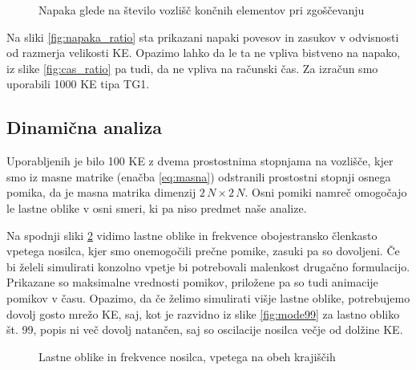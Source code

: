 \begin{figure}[ht]
    \centering
    \caption{Napaka glede na število vozlišč končnih elementov pri zgoščevanju}
    \label{fig:napaka_zgost}
\end{figure}

Na sliki \ref{fig:napaka_ratio} sta prikazani napaki povesov in zasukov v odvisnosti od razmerja velikosti KE. Opazimo lahko da le ta ne vpliva bistveno na napako, iz slike \ref{fig:cas_ratio} pa tudi, da ne vpliva na računski čas. Za izračun smo uporabili 1000 KE tipa TG1.


\FloatBarrier
\subsection{Dinamična analiza}

Uporabljenih je bilo 100 KE z dvema prostostnima stopnjama na vozlišče, kjer smo iz masne matrike (enačba \ref{eq:masna}) odstranili prostostni stopnji osnega pomika, da je masna matrika dimenzij $2\,N\times 2\,N$. Osni pomiki namreč omogočajo le lastne oblike v osni smeri, ki pa niso predmet naše analize.

Na spodnji sliki \ref{fig:last_vpet} vidimo lastne oblike in frekvence obojestransko členkasto vpetega nosilca, kjer smo onemogočili prečne pomike, zasuki pa so dovoljeni. Če bi želeli simulirati konzolno vpetje bi potrebovali malenkost drugačno formulacijo. Prikazane so maksimalne vrednosti pomikov, priložene pa so tudi animacije pomikov v času. Opazimo, da če želimo simulirati višje lastne oblike, potrebujemo dovolj gosto mrežo KE, saj, kot je razvidno iz slike \ref{fig:mode99} za lastno obliko št. 99, popis ni več dovolj natančen, saj so oscilacije nosilca večje od dolžine KE.

\begin{figure}[ht]
    \centering
    \caption{Lastne oblike in frekvence nosilca, vpetega na obeh krajiščih}
    \label{fig:last_vpet}
\end{figure}

